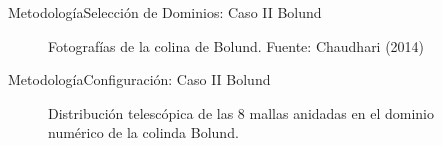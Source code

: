 \documentclass[mathserif,10pt]{beamer}
\begin{document}
\begin{frame}{Metodología}{Selección de Dominios: Caso II Bolund}
	\begin{figure}[H]
		\centering{}%
		\caption{Fotografías de la colina de Bolund. Fuente: Chaudhari (2014)}
		\label{fig:05_terreno_bolund}
	\end{figure}
\end{frame}

\begin{frame}{Metodología}{Configuración: Caso II Bolund}
	\begin{figure}[H]
		\centering
		
		
		\caption{Distribución telescópica de las 8 mallas anidadas en el dominio numérico de la colinda Bolund.}
		\label{fig:05_dom_bol}
	\end{figure}
\end{frame}
\end{document}
